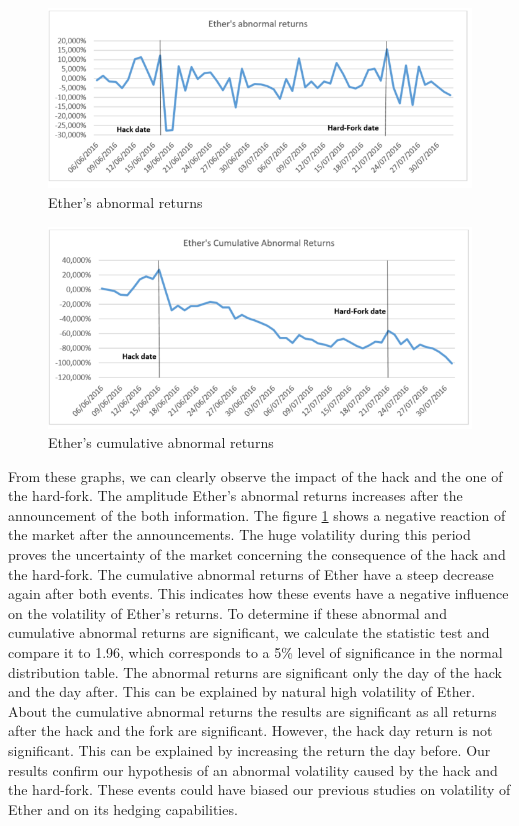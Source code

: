 \documentclass[11pt]{report}
\begin{document}
 \begin{figure}[!h]
\centering
\includegraphics[scale=1.1]{Chap6/ETHAbnormal}\medbreak
\centering
\caption{Ether's abnormal returns}
\label{Abnormal}
\end{figure}
 \begin{figure}[!h]
\centering
\includegraphics[scale=1.1]{Chap6/ETHCumul}\medbreak
\centering
\caption{Ether's cumulative abnormal returns}
\label{Cumul}
\end{figure}
\medbreak

From these graphs, we can clearly observe the impact of the hack and the one of the hard-fork. The amplitude Ether’s abnormal returns increases after the announcement of the both information. The figure \ref{Abnormal} shows a negative reaction of the market after the announcements. The huge volatility during this period proves the uncertainty of the market concerning the consequence of the hack and the hard-fork. The cumulative abnormal returns of Ether have a steep decrease again after both events. This indicates how these events have a negative influence on the volatility of Ether’s returns. \clearpage 
To determine if these abnormal and cumulative abnormal returns are significant, we calculate the statistic test and compare it to 1.96, which corresponds to a 5\% level of significance in the normal distribution table. The abnormal returns are significant only the day of the hack and the day after. This can be explained by natural high volatility of Ether. About the cumulative abnormal returns the results are significant as all returns after the hack and the fork are significant. However, the hack day return is not significant. This can be explained by increasing the return the day before.\smallbreak
Our results confirm our hypothesis of an abnormal volatility caused by the hack and the hard-fork. These events could have biased our previous studies on volatility of Ether and on its hedging capabilities. \clearpage
\end{document}
